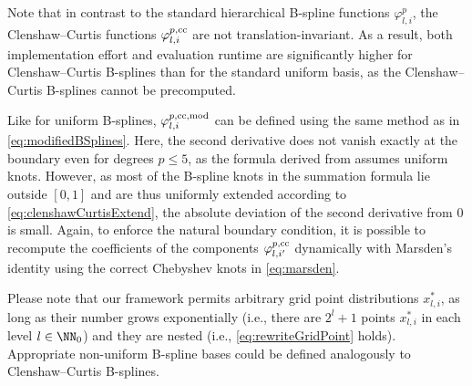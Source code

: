 Note that in contrast to the standard hierarchical B-spline functions
$\varphi_{l,i}^p$, the Clenshaw--Curtis functions
$\varphi_{l,i}^{p,\mathrm{cc}}$ are not translation-invariant.
As a result, both implementation effort and evaluation runtime
are significantly higher for Clenshaw--Curtis B-splines than
for the standard uniform basis,
as the Clenshaw--Curtis B-splines cannot be precomputed.

Like for uniform B-splines,
$\varphi_{l,i}^{p,\mathrm{cc},\mathrm{mod}}$ can be defined using the
same method as in \eqref{eq:modifiedBSplines}.
Here, the second derivative does not vanish exactly at the boundary
even for degrees $p \le 5$,
as the formula derived from  assumes uniform knots.
However, as most of the B-spline knots in the summation formula
lie outside $[0, 1]$ and are thus uniformly extended according
to \eqref{eq:clenshawCurtisExtend},
the absolute deviation of the second derivative from $0$ is small.
Again, to enforce the natural boundary condition,
it is possible to recompute the coefficients
of the components $\varphi_{l,i'}^{p,\mathrm{cc}}$
dynamically with Marsden's identity using the correct Chebyshev knots
in \eqref{eq:marsden}.

Please note that our framework permits arbitrary grid point distributions
$x_{l,i}^\ast$,
as long as their number grows exponentially
(i.e., there are $2^l + 1$ points $x_{l,i}^\ast$ in each level $l \in \NN_0$)
and they are nested
(i.e., \eqref{eq:rewriteGridPoint} holds).
Appropriate non-uniform B-spline bases could be defined analogously
to Clenshaw--Curtis B-splines.
